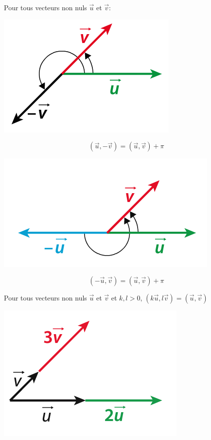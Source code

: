 \documentclass[a4paper,11pt]{article}
\theoremstyle{break}
\begin{document}
\begin{proposition}
 Pour tous vecteurs non nuls $\vec{u}$ et $\vec{v}$:
 \begin{multicols}{2}
  
  \begin{center}
    \includegraphics[scale=0.5]{../Images/uMoinsv.png}
  \end{center}
  $$(\vec{u},-\vec{v})=(\vec{u},\vec{v})+\pi$$
  
  \columnbreak 

    \begin{center}
    \includegraphics[scale=0.5]{../Images/moinsUetV.png}
  \end{center}
  $$(-\vec{u},\vec{v})=(\vec{u},\vec{v})+\pi$$
  \end{multicols}
\end{proposition}

\begin{proposition}
Pour tous vecteurs non nuls $\vec{u}$ et $\vec{v}$
et $k,l>0$, $(k\vec{u},l\vec{v})=(\vec{u},\vec{v})$
 \begin{center}
    \includegraphics[scale=0.5]{../Images/2u3v.png}
  \end{center}
\end{proposition}
\end{document}
